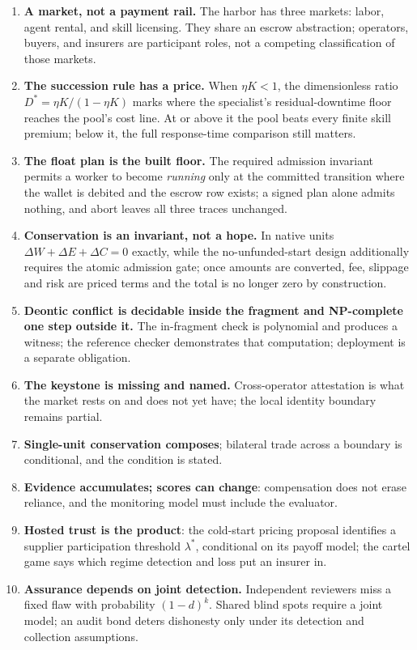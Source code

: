 \documentclass[11pt,a4paper]{article}
\theoremstyle{definition}
\theoremstyle{definition}
\theoremstyle{remark}
\begin{document}
\begin{enumerate}[leftmargin=1.6em,itemsep=2pt]
\item \textbf{A market, not a payment rail.} The harbor has three markets: labor, agent rental, and skill licensing. They share an escrow abstraction; operators, buyers, and insurers are participant roles, not a competing classification of those markets.
\item \textbf{The succession rule has a price.} When $\eta K<1$, the dimensionless ratio $D^{\ast}=\eta K/(1-\eta K)$
marks where the specialist's residual-downtime floor reaches the pool's cost
line. At or above it the pool beats every finite skill premium; below it,
the full response-time comparison still matters.
\item \textbf{The float plan is the built floor.} The required admission invariant permits a worker to become \emph{running} only at the committed transition where the wallet is debited and the escrow row exists; a signed plan alone admits nothing, and abort leaves all three traces unchanged.
\item \textbf{Conservation is an invariant, not a hope.} In native units $\Delta W+\Delta E+\Delta C=0$ exactly, while the no-unfunded-start design additionally requires the atomic admission gate; once amounts are converted, fee, slippage and risk are priced terms and the total is no longer zero by construction.
\item \textbf{Deontic conflict is decidable inside the fragment and NP-complete one step outside it.} The in-fragment check is polynomial and produces a witness; the reference checker demonstrates that computation; deployment is a separate obligation.
\item \textbf{The keystone is missing and named.} Cross-operator attestation is what the market rests on and does not yet have; the local identity boundary remains partial.
\item \textbf{Single-unit conservation composes}; bilateral trade across a boundary is conditional, and the condition is stated.
\item \textbf{Evidence accumulates; scores can change}: compensation does not erase reliance, and the monitoring model must include the evaluator.
\item \textbf{Hosted trust is the product}: the cold-start pricing proposal identifies a supplier participation threshold $\lambda^{\ast}$, conditional on its payoff model; the cartel game says which regime detection and loss put an insurer in.
\item \textbf{Assurance depends on joint detection.} Independent reviewers
miss a fixed flaw with probability $(1-d)^k$. Shared blind spots require a
joint model; an audit bond deters dishonesty only under its detection and
collection assumptions.
\end{enumerate}
\end{document}
